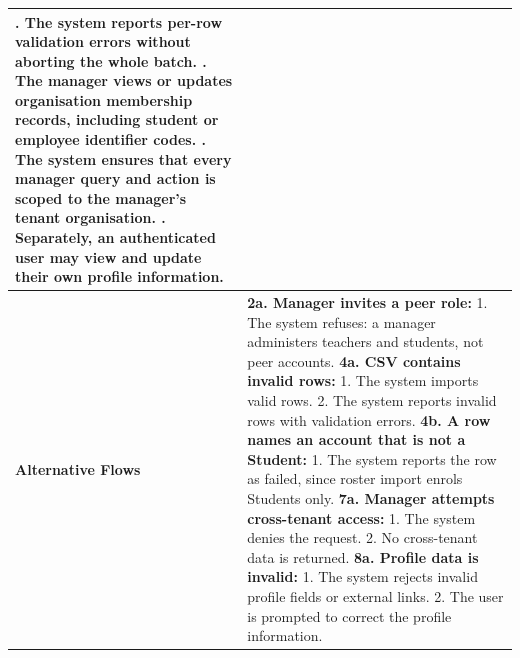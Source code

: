 \begin{longtable}{|>{\raggedright\arraybackslash}p{}|>{\raggedright\arraybackslash}p{}|}
5. The system reports per-row validation errors without aborting the whole batch. \newline
6. The manager views or updates organisation membership records, including student or employee identifier codes. \newline
7. The system ensures that every manager query and action is scoped to the manager's tenant organisation. \newline
8. Separately, an authenticated user may view and update their own profile information. \\ \hline
\textbf{Alternative Flows} &
\textbf{2a. Manager invites a peer role:} \newline
\hspace*{1em}1. The system refuses: a manager administers teachers and students, not peer accounts. \newline
\textbf{4a. CSV contains invalid rows:} \newline
\hspace*{1em}1. The system imports valid rows. \newline
\hspace*{1em}2. The system reports invalid rows with validation errors. \newline
\textbf{4b. A row names an account that is not a Student:} \newline
\hspace*{1em}1. The system reports the row as failed, since roster import enrols Students only. \newline
\textbf{7a. Manager attempts cross-tenant access:} \newline
\hspace*{1em}1. The system denies the request. \newline
\hspace*{1em}2. No cross-tenant data is returned. \newline
\textbf{8a. Profile data is invalid:} \newline
\hspace*{1em}1. The system rejects invalid profile fields or external links. \newline
\hspace*{1em}2. The user is prompted to correct the profile information. \\
\end{longtable}


